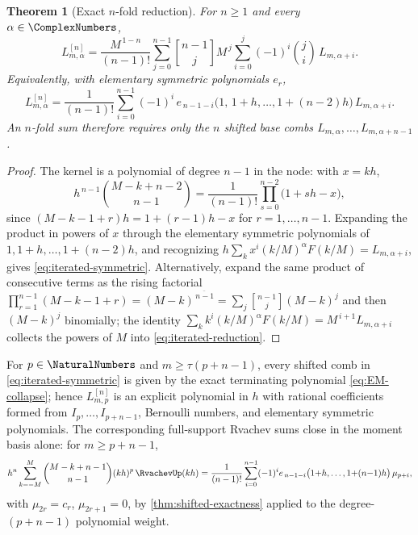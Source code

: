 \documentclass[11pt,oneside]{article}
\numberwithin{equation}{section}
\newtheorem{theorem}{Theorem}[section]
\theoremstyle{definition}
\theoremstyle{remark}
\newcommand{\rise}[2]{#1^{\overline{#2}}}
\newcommand{\stirlingfirst}[2]{\genfrac{[}{]}{0pt}{}{#1}{#2}}
\begin{document}
\begin{theorem}[Exact $n$-fold reduction]
\label{thm:iterated-reduction}
For $n\ge1$ and every $\alpha\in\ComplexNumbers$,
\begin{equation}
 \boxed{\;
 L^{[n]}_{m,\alpha}
 =\frac{M^{\,1-n}}{(n-1)!}
 \sum_{j=0}^{n-1}\stirlingfirst{n-1}{j}M^{\,j}
 \sum_{i=0}^{j}(-1)^{i}\binom ji\,
 L_{m,\alpha+i}.
 \;}
 \label{eq:iterated-reduction}
\end{equation}
Equivalently, with elementary symmetric polynomials $e_r$,
\begin{equation}
 L^{[n]}_{m,\alpha}
 =\frac{1}{(n-1)!}
 \sum_{i=0}^{n-1}(-1)^{i}\,
 e_{\,n-1-i}\bigl(1,\,1{+}h,\dots,1{+}(n{-}2)h\bigr)\,
 L_{m,\alpha+i}.
 \label{eq:iterated-symmetric}
\end{equation}
An $n$-fold sum therefore requires only the $n$ shifted base combs
$L_{m,\alpha},\dots,L_{m,\alpha+n-1}$.
\end{theorem}

\begin{proof}
The kernel is a polynomial of degree $n-1$ in the node: with $x=kh$,
\[
 h^{\,n-1}\binom{M-k+n-2}{n-1}
 =\frac{1}{(n-1)!}\prod_{s=0}^{n-2}\bigl(1+sh-x\bigr),
\]
since $(M-k-1+r)h=1+(r-1)h-x$ for $r=1,\dots,n-1$.  Expanding the
product in powers of $x$ through the elementary symmetric polynomials
of $1,1{+}h,\dots,1{+}(n{-}2)h$, and recognizing
$h\sum_kx^{i}(k/M)^{\alpha}F(k/M)=L_{m,\alpha+i}$, gives
\eqref{eq:iterated-symmetric}.  Alternatively, expand the same product
of consecutive terms as the rising factorial
$\prod_{r=1}^{n-1}(M-k-1+r)=\rise{(M-k)}{\,n-1}
=\sum_{j}\stirlingfirst{n-1}{j}(M-k)^{j}$ and then $(M-k)^{j}$
binomially; the identity
$\sum_kk^{i}(k/M)^{\alpha}F(k/M)=M^{\,i+1}L_{m,\alpha+i}$ collects
the powers of $M$ into \eqref{eq:iterated-reduction}.
\end{proof}

\begin{corollary}
\label{cor:iterated-natural}
For $p\in\NaturalNumbers$ and $m\ge\tau(p+n-1)$, every shifted comb in
\eqref{eq:iterated-symmetric} is given by the exact terminating
polynomial \eqref{eq:EM-collapse}; hence $L^{[n]}_{m,p}$ is an
explicit polynomial in $h$ with rational coefficients formed from
$I_p,\dots,I_{p+n-1}$, Bernoulli numbers, and elementary symmetric
polynomials.  The corresponding full-support Rvachev sums close in
the moment basis alone: for $m\ge p+n-1$,
\begin{equation}
 h^{n}\sum_{k=-M}^{M}\binom{M-k+n-1}{n-1}(kh)^{p}\,\RvachevUp(kh)
 =\frac{1}{(n-1)!}
 \sum_{i=0}^{n-1}(-1)^{i}
 e_{\,n-1-i}\bigl(1{+}h,\dots,1{+}(n{-}1)h\bigr)\,
 \mu_{p+i},
 \label{eq:iter-up-moments}
\end{equation}
with $\mu_{2r}=c_r$, $\mu_{2r+1}=0$, by
\cref{thm:shifted-exactness} applied to the degree-$(p{+}n{-}1)$
polynomial weight.
\end{corollary}
\end{document}
